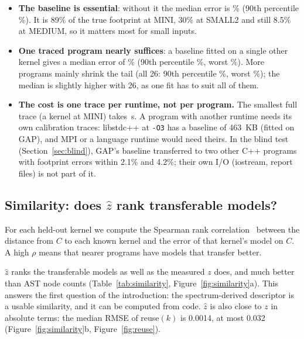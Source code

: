 \documentclass[11pt]{article}
\newcommand{\fittable}[1]{\sbox{\fitbox}{}%
  \ifdim\wd\fitbox>\linewidth\resizebox{\linewidth}{!}{\usebox{\fitbox}}\else\usebox{\fitbox}\fi}
\newcommand{\code}[1]{\texttt{#1}}
\newcommand{\secref}[1]{Section~\ref{#1}}
\newcommand{\figref}[1]{Figure~\ref{#1}}
\newcommand{\tabref}[1]{Table~\ref{#1}}
\newcommand{\zhat}{\hat z}
\begin{document}
\begin{itemize}
\item \textbf{The baseline is essential}: without it the median error is \numbsNone\% (90th percentile
\numbsNonePninety\%). It is 89\% of the true footprint at MINI, 30\% at SMALL2 and still 8.5\% at MEDIUM, so it matters
most for small inputs.
\item \textbf{One traced program nearly suffices}: a baseline fitted on a single other kernel gives a median error of
\numbsOne\% (90th percentile \numbsOnePninety\%, worst \numbsOneMax\%). More programs mainly shrink the tail (all 26:
90th percentile \numbsAllPninety\%, worst \numbsAllMax\%); the median is slightly higher with 26, as one fit has to suit
all of them.
\item \textbf{The cost is one trace per runtime, not per program.} The smallest full trace (a kernel at MINI) takes
\numovSmallestTrace\,s. A program with another runtime needs its own calibration traces: libstdc++ at \code{-O3}
has a baseline of 463~KB (fitted on GAP), and MPI or a language runtime would need theirs. In the blind test
(\secref{sec:blind}), GAP's baseline transferred to two other C++ programs with footprint errors within 2.1\% and
4.2\%; their own I/O (iostream, report files) is not part of it.
\end{itemize}

\subsection{Similarity: does $\zhat$ rank transferable models?}

For each held-out kernel we compute the Spearman rank correlation~\cite{spearman1904} between the distance from $C$
to each known kernel and the error of that kernel's model on $C$. A high $\rho$ means that nearer programs have
models that transfer better.

\begin{table}[!htbp]
\centering\small
\caption{Spearman $\rho$ between descriptor distance and transfer error, over the 27 held-out kernels.}
\label{tab:similarity}
\fittable{tables/similarity.tex}
\end{table}

$\zhat$ ranks the transferable models as well as the measured $z$ does, and much better than AST node counts
(\tabref{tab:similarity}, \figref{fig:similarity}a). This answers the first question of the introduction: the
spectrum-derived descriptor is a usable similarity, and it can be computed from code. $\zhat$ is also close to $z$ in
absolute terms: the median RMSE of reuse$(k)$ is 0.0014, at most 0.032 (\figref{fig:similarity}b,
\figref{fig:reuse}).
\end{document}
